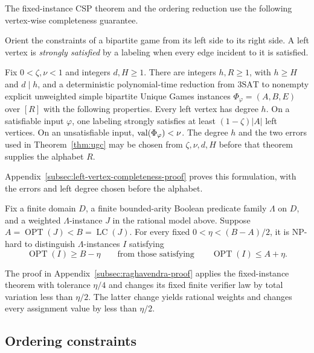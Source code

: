 The fixed-instance CSP theorem and the ordering reduction use the
following vertex-wise completeness guarantee.

Orient the constraints of a bipartite game from its left side to its
right side.  A left vertex is \emph{strongly satisfied} by a labeling
when every edge incident to it is satisfied.

\begin{lemma}\label{lem:simple-left-vertex-completeness}
Fix \(0<\zeta,\nu<1\) and integers \(d,H\ge1\).  There are integers
\(h,R\ge1\), with \(h\ge H\) and \(d\mid h\), and a deterministic
polynomial-time reduction from \(\mathrm{3SAT}\) to nonempty explicit
unweighted simple bipartite Unique Games instances
\(\Phi_\varphi=(A,B,E)\) over \([R]\) with the following properties.
Every left vertex has degree \(h\).  On a satisfiable input \(\varphi\),
one labeling strongly satisfies at least \((1-\zeta)|A|\) left vertices.
On an unsatisfiable input, \(\operatorname{val}(\Phi_\varphi)<\nu\).
The degree \(h\) and the two errors used in
Theorem~\ref{thm:ugc} may be chosen from \(\zeta,\nu,d,H\) before that
theorem supplies the alphabet \(R\).
\end{lemma}

Appendix~\ref{subsec:left-vertex-completeness-proof} proves this formulation, with
the errors and left degree chosen before the alphabet.

\begin{corollary}\label{cor:raghavendra-consequence}
Fix a finite domain \(D\), a finite bounded-arity Boolean predicate
family \(\Lambda\) on \(D\), and a weighted \(\Lambda\)-instance \(J\)
in the rational model above.  Suppose
\(A=\operatorname{OPT}(J)<B=\operatorname{LC}(J)\).
For every fixed \(0<\eta<(B-A)/2\), it is NP-hard to distinguish
\(\Lambda\)-instances \(I\) satisfying
\[
 \operatorname{OPT}(I)\ge B-\eta
 \qquad\text{from those satisfying}\qquad
 \operatorname{OPT}(I)\le A+\eta.
\]
\end{corollary}
The proof in Appendix~\ref{subsec:raghavendra-proof} applies the
fixed-instance theorem with tolerance $\eta/4$ and changes its fixed
finite verifier law by total variation less than $\eta/2$.  The latter
change yields rational weights and changes every assignment value by
less than $\eta/2$.


\subsection{Ordering constraints}

